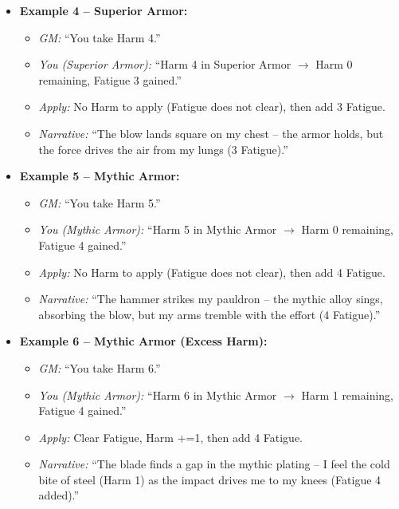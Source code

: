 \begin{itemize}
  \item \textbf{Example 4 -- Superior Armor:}
        \begin{itemize}
          \item \textit{GM:} ``You take Harm 4.''
          \item \textit{You (Superior Armor):} ``Harm 4 in Superior Armor $\to$ Harm 0 remaining, Fatigue 3 gained.''
          \item \textit{Apply:} No Harm to apply (Fatigue does not clear), then add 3 Fatigue.
          \item \textit{Narrative:} ``The blow lands square on my chest -- the armor holds, but the force drives the air from my lungs (3 Fatigue).''
        \end{itemize}

  \item \textbf{Example 5 -- Mythic Armor:}
        \begin{itemize}
          \item \textit{GM:} ``You take Harm 5.''
          \item \textit{You (Mythic Armor):} ``Harm 5 in Mythic Armor $\to$ Harm 0 remaining, Fatigue 4 gained.''
          \item \textit{Apply:} No Harm to apply (Fatigue does not clear), then add 4 Fatigue.
          \item \textit{Narrative:} ``The hammer strikes my pauldron -- the mythic alloy sings, absorbing the blow, but my arms tremble with the effort (4 Fatigue).''
        \end{itemize}

  \item \textbf{Example 6 -- Mythic Armor (Excess Harm):}
        \begin{itemize}
          \item \textit{GM:} ``You take Harm 6.''
          \item \textit{You (Mythic Armor):} ``Harm 6 in Mythic Armor $\to$ Harm 1 remaining, Fatigue 4 gained.''
          \item \textit{Apply:} Clear Fatigue, Harm +=1, then add 4 Fatigue.
          \item \textit{Narrative:} ``The blade finds a gap in the mythic plating -- I feel the cold bite of steel (Harm 1) as the impact drives me to my knees (Fatigue 4 added).''
        \end{itemize}


\end{itemize}
